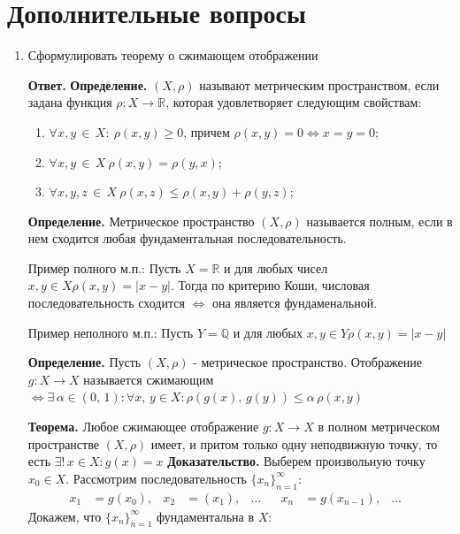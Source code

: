 \documentclass{article}
\begin{document}
    \section{Дополнительные вопросы}
    \begin{enumerate}
        \item Сформулировать теорему о сжимающем отображении
        
        {\bfseries Ответ. }
    {\bfseries Определение. } $(X, \rho)$ называют метрическим пространством, если задана функция 
    $\rho: X \rightarrow \mathbb{R}$, которая удовлетворяет следующим свойствам: 
    \begin{enumerate}
        \item $\forall x, y\,  \in\, X: \  \rho(x,y) \geqslant 0$, причем $\rho(x,y) = 0 \Leftrightarrow x = y = 0$;
        \item $\forall x, y \, \in \, X \  \rho(x,y) = \rho(y,x)$;
        \item $\forall x, y, z \, \in \, X \ \rho(x,z) \leqslant \rho(x,y) + \rho(y,z)$;
    \end{enumerate}
    
    {\bfseries Определение. } Метрическое пространство $(X, \rho)$ называется полным, если в нем сходится любая 
    фундаментальная последовательность.

    Пример полного м.п.: 
    Пусть $X = \mathbb{R}$ и для любых чисел $x, y \in X \rho(x,y) = |x-y|$. Тогда по критерию
    Коши, числовая последовательность сходится $\Leftrightarrow$ она является фундаменальной.
    
    Пример неполного м.п.: 
    Пусть $Y = \mathbb{Q}$ и для любых $x, y \in Y \rho (x,y) = |x-y| $


        {\bfseries Определение. } Пусть $(X, \rho)$ - метрическое пространство. Отображение 
        $g : X \rightarrow X$ называется сжимающим $\Leftrightarrow \exists \, \alpha \in (0,\, 1): \forall x, \, y \in X: \rho(g(x),\,g(y)) \leqslant \alpha \,\rho(x,y)$ 
        


        {\bfseries Теорема. } Любое сжимающее отображение $g: X \rightarrow X$ в полном 
        метрическом пространстве $(X, \rho)$ имеет, и притом только одну неподвижную точку, то есть 
        $\exists!\, x\in X: g(x) = x$ 
        {\bfseries Доказательство.} Выберем произвольную точку $x_0 \in X$. Рассмотрим последовательность
        $\{x_n\}_{n=1}^\infty$:
        \begin{align*}
            x_1 &= g(x_0), & x_2 &= (x_1), & \ldots& & x_n &= g(x_{n-1}), & \ldots &
        \end{align*}
        Докажем, что $\{x_n\}_{n=1}^\infty$ фундаментальна в $X$:
        

\end{enumerate}
\end{document}
